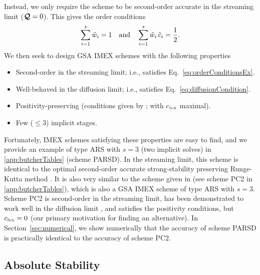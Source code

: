 Instead, we only require the scheme to be second-order accurate in the streaming limit ($\boldsymbol{\mathcal{Q}}=0$).  
This gives the order conditions
\begin{equation}
  \sum_{i=1}^{s}\tilde{w}_{i}=1
  \quad\text{and}\quad
  \sum_{i=1}^{s}\tilde{w}_{i}\,\tilde{c}_{i}=\frac{1}{2}.  
  \label{eq:orderConditionsEx}
\end{equation}
We then seek to design GSA IMEX schemes with the following properties
\begin{itemize}
  \item Second-order in the streaming limit; i.e., satisfies Eq.~\eqref{eq:orderConditionsEx}.
  \item Well-behaved in the diffusion limit; i.e., satisfies Eq.~\eqref{eq:diffusionCondition}.
  \item Positivity-preserving (conditions given by \cite{hu_etal_2017}; with $c_{\mbox{\tiny Sch}}$ maximal).
  \item Few ($\le3$) implicit stages.
\end{itemize}
Fortunately, IMEX schemes satisfying these properties are easy to find, and we provide an example of type ARS with $s=3$ (two implicit solves) in \ref{app:butcherTables} (scheme PARSD).  
In the streaming limit, this scheme is identical to the optimal second-order accurate strong-stability preserving Runge-Kutta method \cite{gottlieb_etal_2001}.  
It is also very similar to the scheme given in \cite{mcclarren_etal_2008} (see scheme PC2 in \ref{app:butcherTables}), which is also a GSA IMEX scheme of type ARS with $s=3$.  
Scheme PC2 is second-order in the streaming limit, has been demonstrated to work well in the diffusion limit \cite{mcclarren_etal_2008,radice_etal_2013}, and satisfies the positivity conditions, but $c_{\mbox{\tiny Sch}}=0$ (our primary motivation for finding an alternative).  
In Section~\ref{sec:numerical}, we show numerically that the accuracy of scheme PARSD is practically identical to the accuracy of scheme PC2.  

\subsection{Absolute Stability}

